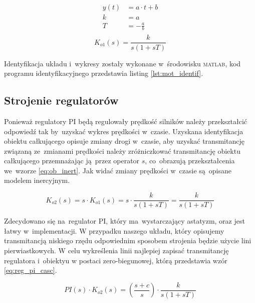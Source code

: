 \documentclass[11pt]{article}
\begin{document}
\begin{equation} \label{eq:line_param}
\begin{aligned}
	y(t) &= a \cdot t + b \\
	k &= a \\
	T &= - \frac{a}{b} \\
\end{aligned}
\end{equation}
\begin{equation} \label{eq:ob_int}
	K_{o1} \left( s \right) = \frac{k}{s \left( 1 + sT \right)}
\end{equation}

Identyfikacja układu i~wykresy zostały wykonane w~środowisku \textsc{matlab}, kod programu identyfikacyjnego przedstawia listing \ref{lst:mot_identif}.

\subsection{Strojenie regulatorów}
Ponieważ regulatory \textsc{PI} będą regulowały prędkość silników należy przekształcić odpowiedź tak by~uzyskać wykres prędkości w~czasie.
Uzyskana identyfikacja obiektu całkującego opisuje zmiany drogi w~czasie, aby uzyskać transmitancję związaną ze~zmianami prędkości należy zróżniczkować transmitancję obiektu całkującego przemnażając ją~przez operator $ s $, co~obrazują przekształcenia we~wzorze \ref{eq:ob_inert}. Jak widać zmiany prędkości w~czasie są~opisane modelem inercyjnym.

\begin{equation} \label{eq:ob_inert}
	K_{o2} \left( s \right) = s \cdot K_{o1} \left( s \right) = s \cdot \frac{k}{s \left( 1 + sT \right)} = \frac{k}{s \left( 1 + sT \right)}
\end{equation}

Zdecydowano się na~regulator \textsc{PI}, który ma~wystarczający astatyzm, oraz jest łatwy w~implementacji.
W przypadku naszego układu, który opisujemy transmitancją niskiego rzędu odpowiednim sposobem strojenia będzie użycie lini pierwiastkowych.
W celu wykreślenia linii najlepiej zapisać transmitancję regulatora i~obiektyu w postaci zero-biegunowej, którą przedstawia wzór \ref{eq:reg_pi_casc}.

\begin{equation} \label{eq:reg_pi_casc}
	PI \left( s \right) \cdot K_{o2} \left( s \right) = \left( \frac{s + c}{s} \right) \cdot \frac{k}{s \left( 1 + sT \right)}
\end{equation}
\end{document}
